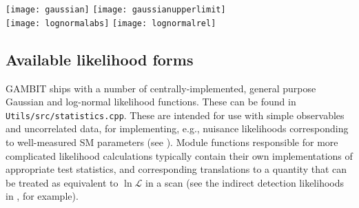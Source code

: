 \documentclass[pdftex,twocolumn,epjc3_preprint,runningheads]{svjour3}
\renewcommand{\_}{\discretionary{\underscore}{}{\underscore}}
\newcommand\term[1]{{\lstset{style=terminal}\lstinline!#1!\lstset{style=cpp}}}
\newcommand{\gambit}{\textsf{GAMBIT}\xspace}
\newcommand{\GB}{\gambit}
\begin{document}
\begin{figure*}[tb]
\centering
\texttt{[image: gaussian]}\hspace{0.1\textwidth}%
\texttt{[image: gaussian\_upperlimit]}\\
\texttt{[image: lognormal\_abs]}\hspace{0.1\textwidth}%
\texttt{[image: lognormal\_rel]}\\
\caption{The different generic likelihood functions available in \GB, described in Sec.\ \ref{stats:likelihoods}: Gaussian (\textit{top left}), Gaussian limit (\textit{top right}) and log-normal (\textit{bottom}). Here we show the log-normal likelihood computed with a fixed \textit{absolute} systematic uncertainty (\textit{bottom left}), and instead with a fixed \textit{fractional} (relative) systematic uncertainty (\textit{bottom right}).  Each curve is computed assuming an observed central value of $x=10$ and standard deviation $\sigma=1$, for two different assumed values of the systematic error. Two potential pitfalls are visible: the profiled upper limit likelihood shows a strong dependence on $\sigma_\epsilon$ at low values of $\mu$, and adopting an absolute systematic uncertainty can introduce additional features in the log-normal likelihood at low $\mu$.}
\label{fig:like}
\end{figure*}

\subsection{Available likelihood forms}
\label{stats:likelihoods}

\GB ships with a number of centrally-implemented, general purpose Gaussian and log-normal likelihood functions.  These can be found in \term{Utils/src/statistics.cpp}.  These are intended for use with simple observables and uncorrelated data, for implementing, e.g., nuisance likelihoods corresponding to well-measured SM parameters (see \cite{SDPBit}).  Module functions responsible for more complicated likelihood calculations typically contain their own implementations of appropriate test statistics, and corresponding translations to a quantity that can be treated as equivalent to $\ln\mathcal{L}$ in a scan (see the indirect detection likelihoods in \cite{DarkBit}, for example).
\end{document}

